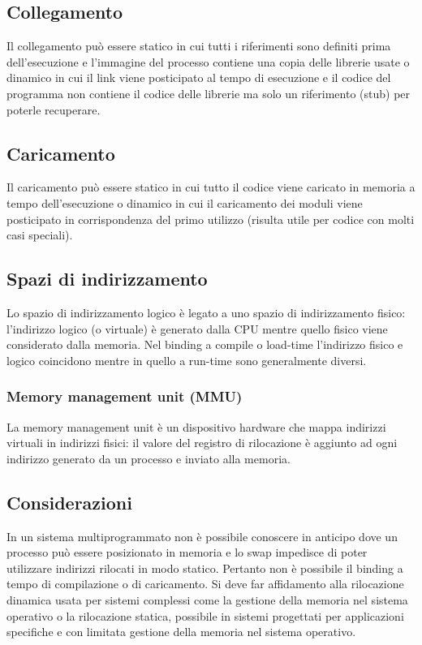 \subsection{Collegamento}
Il collegamento pu\`o essere statico in cui tutti i riferimenti sono definiti prima dell'esecuzione e l'immagine del processo contiene una copia delle librerie usate o dinamico in cui il
link viene posticipato al tempo di esecuzione e il codice del programma non contiene il codice delle librerie ma solo un riferimento (stub) per poterle recuperare. 
\subsection{Caricamento}
Il caricamento pu\`o essere statico in cui tutto il codice viene caricato in memoria a tempo dell'esecuzione o dinamico in cui il caricamento dei moduli viene posticipato in 
corrispondenza del primo utilizzo (risulta utile per codice con molti casi speciali).
\subsection{Spazi di indirizzamento}
Lo spazio di indirizzamento logico \`e legato a uno spazio di indirizzamento fisico: l'indirizzo logico (o virtuale) \`e generato dalla CPU mentre quello fisico viene considerato dalla
memoria. Nel binding a compile o load-time l'indirizzo fisico e logico coincidono mentre in quello a run-time sono generalmente diversi. 
\subsubsection{Memory management unit (MMU)}
La memory management unit \`e un dispositivo hardware che mappa indirizzi virtuali in indirizzi fisici: il valore del registro di rilocazione \`e aggiunto ad ogni indirizzo generato
da un processo e inviato alla memoria. 
\subsection{Considerazioni}
In un sistema multiprogrammato non \`e possibile conoscere in anticipo dove un processo pu\`o essere posizionato in memoria e lo swap impedisce di poter utilizzare indirizzi rilocati
in modo statico. Pertanto non \`e possibile il binding a tempo di compilazione o di caricamento. Si deve far affidamento alla rilocazione dinamica usata per sistemi complessi come la
gestione della memoria nel sistema operativo o la rilocazione statica, possibile in sistemi progettati per applicazioni specifiche e con limitata gestione della memoria nel sistema
operativo. 

